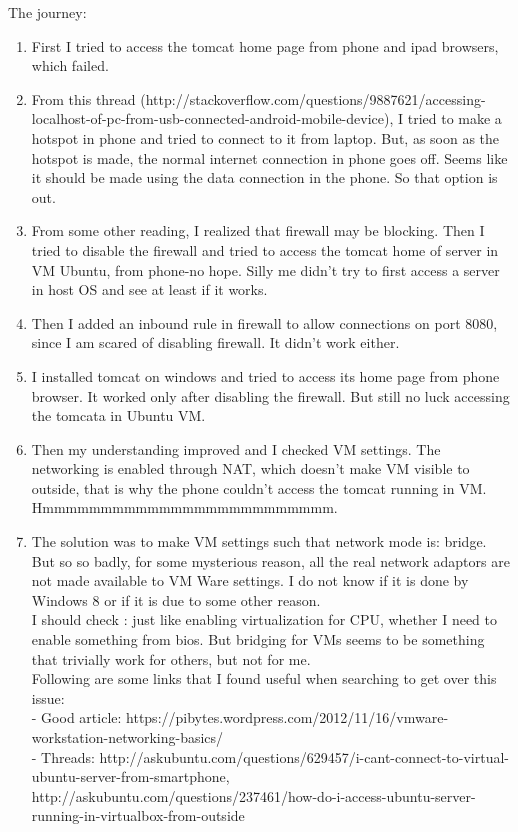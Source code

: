 \documentclass[11pt]{article}
\begin{document}
The journey:\\
\begin{enumerate}
 \item First I tried to access the tomcat home page from phone and ipad browsers, which failed.
 \item From this thread (http://stackoverflow.com/questions/9887621/accessing-localhost-of-pc-from-usb-connected-android-mobile-device), I tried to 
make a hotspot in phone and tried to connect to it from laptop. But, as soon as the hotspot is made, the normal internet connection in phone goes 
off. Seems like it should be made using the data connection in the phone. So that option is out.
\item From some other reading, I realized that firewall may be blocking. Then I tried to disable the firewall and tried to access the tomcat home of 
server in VM Ubuntu, from phone-no hope. Silly me didn't try to first access a server in host OS and see at least if it works.
\item Then I added an inbound rule in firewall to allow connections on port 8080, since I am scared of disabling firewall. It didn't work either.
\item I installed tomcat on windows and tried to access its home page from phone browser. It worked only after disabling the firewall. But still no 
luck accessing the tomcata in Ubuntu VM.
\item Then my understanding improved and I checked VM settings. The networking is enabled through NAT, which doesn't make VM visible to outside, that 
is why the phone couldn't access the tomcat running in VM. Hmmmmmmmmmmmmmmmmmmmmmmmmm.
\item The solution was to make VM settings such that network mode is: bridge. But so so badly, for some mysterious reason, all the real network 
adaptors are not made available to VM Ware settings. I do not know if it is done by Windows 8 or if it is due to some other reason.\\

I should check : just like enabling virtualization for CPU, whether I need to enable something from bios. But bridging for VMs seems to be something 
that trivially work for others, but not for me.\\

Following are some links that I found useful when searching to get over this issue:\\
- Good article: https://pibytes.wordpress.com/2012/11/16/vmware-workstation-networking-basics/\\
- Threads: http://askubuntu.com/questions/629457/i-cant-connect-to-virtual-ubuntu-server-from-smartphone, 
http://askubuntu.com/questions/237461/how-do-i-access-ubuntu-server-running-in-virtualbox-from-outside\\


\end{enumerate}
\end{document}
